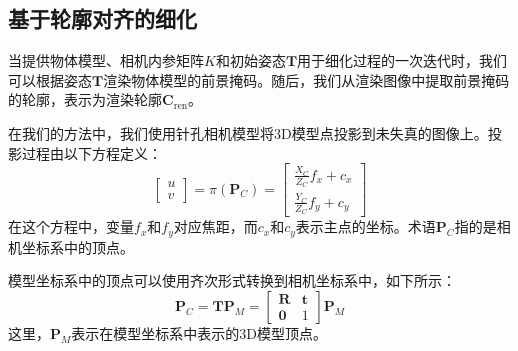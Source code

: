 \subsection{基于轮廓对齐的细化}

当提供物体模型、相机内参矩阵$K$和初始姿态$\mathbf{T}$用于细化过程的一次迭代时，我们可以根据姿态$\mathbf{T}$渲染物体模型的前景掩码。随后，我们从渲染图像中提取前景掩码的轮廓，表示为渲染轮廓$\mathbf{C}_\text{ren}$。

在我们的方法中，我们使用针孔相机模型将3D模型点投影到未失真的图像上。投影过程由以下方程定义：
\begin{equation}
\begin{bmatrix}u\\v\end{bmatrix} = \pi(\mathbf{P}_C) = \begin{bmatrix}\frac{X_C}{Z_C} f_x+c_x\\[3pt] \frac{Y_C}{Z_C} f_y+c_y\end{bmatrix}
\label{eq:camera}
\end{equation}
在这个方程中，变量$f_x$和$f_y$对应焦距，而$c_x$和$c_y$表示主点的坐标。术语$\mathbf{P}_C$指的是相机坐标系中的顶点。

\par 模型坐标系中的顶点可以使用齐次形式转换到相机坐标系中，如下所示：
\begin{equation}
\mathbf{P}_C = \mathbf{T}\mathbf{P}_M=
\begin{bmatrix}
    \mathbf{R}&\mathbf{t}\\
    \mathbf{0} & 1
\end{bmatrix}
\mathbf{P}_M
\end{equation}
这里，$\mathbf{P}_M$表示在模型坐标系中表示的3D模型顶点。

